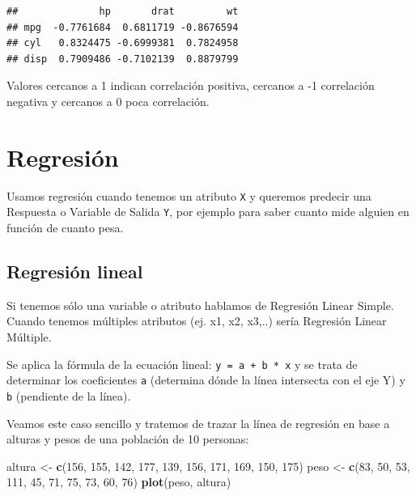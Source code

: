 \documentclass[]{book}
\newenvironment{Shaded}{\begin{snugshade}}{\end{snugshade}}
\newcommand{\DecValTok}[1]{\textcolor[rgb]{0.00,0.00,0.81}{#1}}
\newcommand{\KeywordTok}[1]{\textcolor[rgb]{0.13,0.29,0.53}{\textbf{#1}}}
\newcommand{\NormalTok}[1]{#1}
\newcommand{\StringTok}[1]{\textcolor[rgb]{0.31,0.60,0.02}{#1}}
\theoremstyle{definition}
\theoremstyle{definition}
\theoremstyle{definition}
\theoremstyle{remark}
\begin{document}
\begin{verbatim}
##              hp       drat         wt
## mpg  -0.7761684  0.6811719 -0.8676594
## cyl   0.8324475 -0.6999381  0.7824958
## disp  0.7909486 -0.7102139  0.8879799
\end{verbatim}

Valores cercanos a 1 indican correlación positiva, cercanos a -1
correlación negativa y cercanos a 0 poca correlación.

\hypertarget{regresion}{%
\section{Regresión}\label{regresion}}

Usamos regresión cuando tenemos un atributo \texttt{X} y queremos
predecir una Respuesta o Variable de Salida \texttt{Y}, por ejemplo para
saber cuanto mide alguien en función de cuanto pesa.

\hypertarget{regresion-lineal}{%
\subsection{Regresión lineal}\label{regresion-lineal}}

Si tenemos sólo una variable o atributo hablamos de Regresión Linear
Simple. Cuando tenemos múltiples atributos (ej. x1, x2, x3,..) sería
Regresión Linear Múltiple.

Se aplica la fórmula de la ecuación lineal: \texttt{y\ =\ a\ +\ b\ *\ x}
y se trata de determinar los coeficientes \texttt{a} (determina dónde la
línea intersecta con el eje Y) y \texttt{b} (pendiente de la línea).

Veamos este caso sencillo y tratemos de trazar la línea de regresión en
base a alturas y pesos de una población de 10 personas:

\begin{Shaded}
\begin{Highlighting}[]
\NormalTok{altura <-}\StringTok{ }\KeywordTok{c}\NormalTok{(}\DecValTok{156}\NormalTok{, }\DecValTok{155}\NormalTok{, }\DecValTok{142}\NormalTok{, }\DecValTok{177}\NormalTok{, }\DecValTok{139}\NormalTok{, }\DecValTok{156}\NormalTok{, }\DecValTok{171}\NormalTok{, }\DecValTok{169}\NormalTok{, }\DecValTok{150}\NormalTok{, }\DecValTok{175}\NormalTok{)}
\NormalTok{peso <-}\StringTok{ }\KeywordTok{c}\NormalTok{(}\DecValTok{83}\NormalTok{, }\DecValTok{50}\NormalTok{, }\DecValTok{53}\NormalTok{, }\DecValTok{111}\NormalTok{, }\DecValTok{45}\NormalTok{, }\DecValTok{71}\NormalTok{, }\DecValTok{75}\NormalTok{, }\DecValTok{73}\NormalTok{, }\DecValTok{60}\NormalTok{, }\DecValTok{76}\NormalTok{)}
\KeywordTok{plot}\NormalTok{(peso, altura)}
\end{Highlighting}
\end{Shaded}
\end{document}

